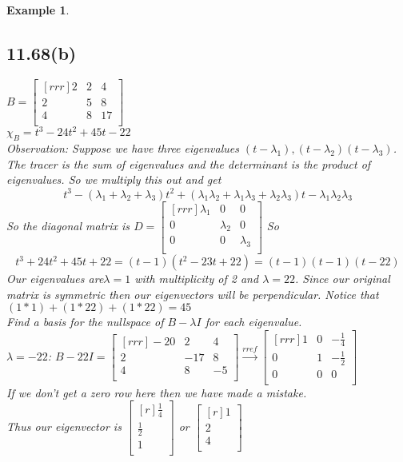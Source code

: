 \documentclass{report}
\newtheorem*{ex}{Example}
\begin{document}
\begin{ex}
\subsection{11.68(b)}
$B=\begin{bmatrix}[rrr]2&2&4\\2&5&8\\4&8&17\\\end{bmatrix}$\\
$\chi_B=t^3-24t^2+45t-22$\\
Observation: Suppose we have three eigenvalues $(t-\lambda_1 ),(t-\lambda_2 )(t-\lambda_3)$. The tracer is the sum of eigenvalues and the determinant is the product of eigenvalues. So we multiply this out and get
\[ t^3-(\lambda_1+\lambda_2+\lambda_3)t^2+(\lambda_1\lambda_2+\lambda_1\lambda_3+\lambda_2\lambda_3)t-\lambda_1\lambda_2\lambda_3 \]
So the diagonal matrix is $D=\begin{bmatrix}[rrr]\lambda_1&0&0\\0&\lambda_2&0\\0&0&\lambda_3\\\end{bmatrix}$
So
\[ t^3+24t^2+45t+22 = (t-1)(t^2-23t+22)=(t-1)(t-1)(t-22) \]
Our eigenvalues are$\lambda=1$ with multiplicity of 2 and $\lambda=22$. Since our original matrix is symmetric then our eigenvectors will be perpendicular.
Notice that $(1*1)+(1*22)+(1*22) = 45$\\
Find a basis for the nullspace of $B-\lambda I$ for each eigenvalue.\\
$\lambda=-22$: $B-22I=\begin{bmatrix}[rrr]-20&2&4\\2&-17&8\\4&8&-5\\\end{bmatrix}\xrightarrow[]{rref} \begin{bmatrix}[rrr]1&0&-\frac{1}{4}\\0&1&-\frac{1}{2}\\0&0&0\\\end{bmatrix}$\\
If we don't get a zero row here then we have made a mistake.\\
Thus our eigenvector is $\begin{bmatrix}[r]\frac{1}{4}\\\frac{1}{2}\\1\\\end{bmatrix}$ or $\begin{bmatrix}[r]1\\2\\4\\\end{bmatrix}$\\

\end{ex}
\end{document}
